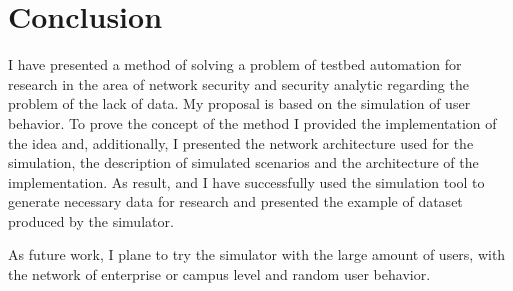 
\section{Conclusion}

I have presented a method of solving a problem of testbed automation for research in the area of network security and security analytic regarding the problem of the lack of data. My proposal is based on the simulation of user behavior. To prove the concept of the method I provided the implementation of the idea and, additionally, I presented the network  architecture used for the simulation, the description of simulated scenarios and the architecture of the implementation. As result, and I have successfully used the simulation tool to generate necessary data for research and presented the example of dataset produced by the simulator.

As future work, I plane to try the simulator with the large amount of users, with the network of enterprise or campus level and random user behavior.